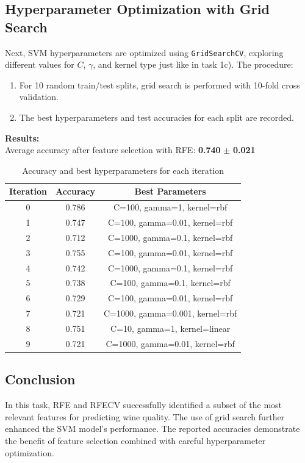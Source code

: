 \subsection{Hyperparameter Optimization with Grid Search}

Next, SVM hyperparameters are optimized using \texttt{GridSearchCV}, exploring different values for $C$, $\gamma$, and kernel type just like in task 1c). The procedure:
\begin{enumerate}
    \item For 10 random train/test splits, grid search is performed with 10-fold cross validation.
    \item The best hyperparameters and test accuracies for each split are recorded.
\end{enumerate}

\textbf{Results:}\\
Average accuracy after feature selection with RFE: \textbf{0.740} $\pm$ \textbf{0.021}\\
\begin{table}[h]
\centering
\begin{tabular}{|c|c|c|}
\hline
\textbf{Iteration} & \textbf{Accuracy} & \textbf{Best Parameters} \\
\hline
0 & 0.786 & C=100, gamma=1, kernel=rbf \\
\hline
1 & 0.747 & C=100, gamma=0.01, kernel=rbf \\
\hline
2 & 0.712 & C=1000, gamma=0.1, kernel=rbf \\
\hline
3 & 0.755 & C=100, gamma=0.01, kernel=rbf \\
\hline
4 & 0.742 & C=1000, gamma=0.1, kernel=rbf \\
\hline
5 & 0.738 & C=100, gamma=0.1, kernel=rbf \\
\hline
6 & 0.729 & C=100, gamma=0.01, kernel=rbf \\
\hline
7 & 0.721 & C=1000, gamma=0.001, kernel=rbf \\
\hline
8 & 0.751 & C=10, gamma=1, kernel=linear \\
\hline
9 & 0.721 & C=1000, gamma=0.01, kernel=rbf \\
\hline
\end{tabular}
\caption{Accuracy and best hyperparameters for each iteration}
\label{tab:results}
\end{table}

\subsection{Conclusion}

In this task, RFE and RFECV successfully identified a subset of the most relevant features for predicting wine quality. The use of grid search further enhanced the SVM model's performance. The reported accuracies demonstrate the benefit of feature selection combined with careful hyperparameter optimization.
